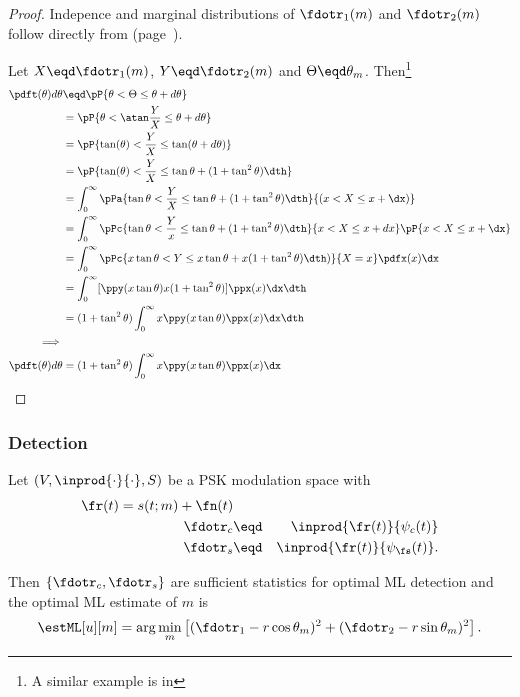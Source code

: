 \begin{proof}

Indepence and marginal distributions of $\fdotr_1(m)$ and $\fdotr_2(m)$
follow directly from
 (page~\pageref{thm:ms_stats}).


Let $X\eqd\fdotr_1(m)$, $Y\eqd\fdotr_2(m)$ and $\Theta\eqd\theta_m$.
Then\footnote{A similar example is in }
\begin{align*}
   \pdft(\theta)d\theta
     &\eqd \pP{\theta < \Theta \le \theta + d\theta}
   \\&=    \pP{\theta < \atan\frac{Y}{X} \le \theta + d\theta}
   \\&=    \pP{\tan(\theta) < \frac{Y}{X} \le \tan(\theta + d\theta)}
   \\&=    \pP{\tan(\theta) < \frac{Y}{X} \le \tan\theta + (1+\tan^2\theta)\dth}
   \\&=    \int_0^\infty \pPa{\tan\theta < \frac{Y}{X} \le \tan\theta + (1+\tan^2\theta)\dth}{(x<X\le x+\dx)}
   \\&=    \int_0^\infty \pPc{\tan\theta < \frac{Y}{x} \le \tan\theta + (1+\tan^2\theta)\dth}{x<X\le x+dx}\pP{x<X\le x+\dx}
   \\&=    \int_0^\infty \pPc{x\tan\theta < Y \le x\tan\theta + x(1+\tan^2\theta)\dth)}{X=x} \pdfx(x)\dx
   \\&=    \int_0^\infty [\ppy(x\tan\theta)x(1+\tan^2\theta)] \ppx(x) \dx \dth
   \\&=    (1+\tan^2\theta) \int_0^\infty x\ppy(x\tan\theta) \ppx(x) \dx \dth
\\\implies\\
   \pdft(\theta)d\theta
     &= (1+\tan^2\theta) \int_0^\infty x\ppy(x\tan\theta) \ppx(x) \dx
\end{align*}
\attention
\end{proof}



\subsubsection{Detection}
\begin{theorem}
Let $(V,\inprod{\cdot}{\cdot},S)$ be a PSK modulation space with
\begin{align*}
   \fr(t) = s(t;m)+\fn(t) \\
   \fdotr_c &\eqd& \inprod{\fr(t)}{\psi_c(t)} \\
   \fdotr_s &\eqd& \inprod{\fr(t)}{\psi_\fs(t)}.
\end{align*}

Then $\{\fdotr_c,\fdotr_s\}$ are sufficient statistics for
optimal ML detection and the optimal ML estimate of $m$ is
\[ \estML[u][m] = \arg\min_m
      \left[
         (\fdotr_1-r\cos\theta_m)^2  +
         (\fdotr_2-r\sin\theta_m)^2
      \right].
\]
\end{theorem}

